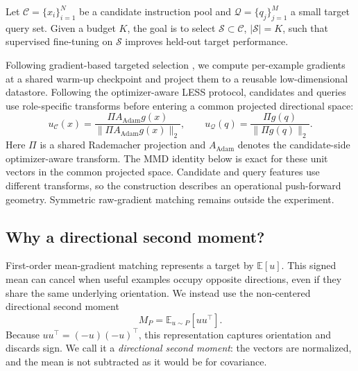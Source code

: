 \documentclass{article}
\begin{document}
Let $\mathcal{C}=\{x_i\}_{i=1}^{N}$ be a candidate instruction pool and
$\mathcal{Q}=\{q_j\}_{j=1}^{M}$ a small target query set. Given a budget $K$,
the goal is to select $\mathcal{S}\subset\mathcal{C}$, $|\mathcal{S}|=K$, such
that supervised fine-tuning on $\mathcal{S}$ improves held-out target
performance.

Following gradient-based targeted selection
\citep{xia2024less,nayak2026critical,mirzasoleiman2020craig,killamsetty2021gradmatch},
we compute per-example gradients at a
shared warm-up checkpoint and project them to a reusable low-dimensional
datastore. Following the optimizer-aware LESS protocol, candidates and queries
use role-specific transforms before entering a common projected directional
space:
\begin{equation}
    u_{\mathcal C}(x)
    =
    \frac{\Pi A_{\mathrm{Adam}}g(x)}
         {\|\Pi A_{\mathrm{Adam}}g(x)\|_2},
    \qquad
    u_{\mathcal Q}(q)
    =
    \frac{\Pi g(q)}
         {\|\Pi g(q)\|_2}.
    \label{eq:role_maps}
\end{equation}
Here $\Pi$ is a shared Rademacher projection and $A_{\mathrm{Adam}}$ denotes
the candidate-side optimizer-aware transform. The MMD identity below is exact
for these unit vectors in the common projected space. Candidate and query
features use different transforms, so the construction describes an
operational push-forward geometry. Symmetric raw-gradient matching remains
outside the experiment.

\subsection{Why a directional second moment?}

First-order mean-gradient matching represents a target by
$\mathbb{E}[u]$. This signed mean can cancel when useful examples occupy
opposite directions, even if they share the same underlying orientation.
We instead use the non-centered directional second moment
\begin{equation}
    M_P = \mathbb{E}_{u\sim P}[uu^\top].
    \label{eq:moment}
\end{equation}
Because $uu^\top=(-u)(-u)^\top$, this representation captures orientation
and discards sign. We call it a \emph{directional second moment}: the vectors
are normalized, and the mean is not subtracted as it would be for covariance.
\end{document}
